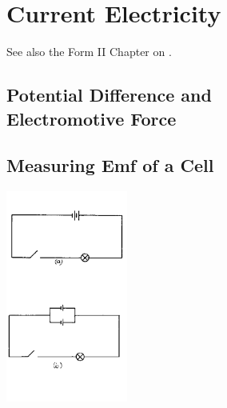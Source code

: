 \section{Current Electricity}
See also the Form II Chapter on .

\begin{multicols}{2}


\section*{Potential Difference and \hfill \\ Electromotive Force}


\subsection{Measuring Emf of a Cell}

\begin{center}
\includegraphics[width=0.3\textwidth]{./img/source/measuring-emf.png}
\end{center}


\end{multicols}
